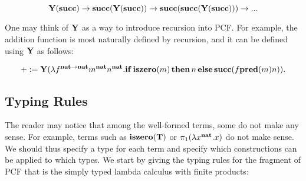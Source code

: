 
$$\textbf{Y}(\textbf{succ}) \to \textbf{succ}(\textbf{Y}(\textbf{succ})) \to \textbf{succ}(\textbf{succ}(\textbf{Y}(\textbf{succ}))) \to ...$$

One may think of $\textbf{Y}$ as a way to introduce recursion into PCF. For example, the addition function is most naturally defined by recursion, and it can be defined using $\textbf{Y}$ as follows:

\[ + := \textbf{Y}(\lambda f^{\mathbf{nat}\to\mathbf{nat}}m^\mathbf{nat}n^\mathbf{nat}.\mathbf{if}\,\mathbf{iszero}(m)\,\mathbf{then}\,n\,\mathbf{else }\,\mathbf{succ}(f \mathbf{pred}(m) n)). \]

\subsection{Typing Rules}

The reader may notice that among the well-formed terms, some do not make any sense. For example, terms such as $\mathbf{iszero}(\mathbf{T})$ or $\pi_1(\lambda x^\mathbf{nat}.x)$ do not make sense. We should thus specify a type for each term and specify which constructions can be applied to which types. We start by giving the typing rules for the fragment of PCF that is the simply typed lambda calculus with finite products:

